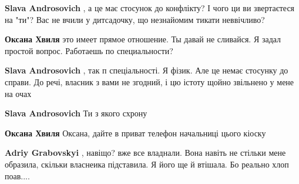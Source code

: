 \begin{itemize}
\begin{itemize}
 
\textbf{Slava Androsovich} , а це має стосунок до конфлікту? І чого ци ви звертаєтеся на "ти"? Вас не вчили у дитсадочку, що незнайомим тикати неввічливо?

 
\textbf{Оксана Хвиля} это имеет прямое отношение. Ты давай не сливайся. Я задал простой вопрос. Работаешь по специальности?

 
\textbf{Slava Androsovich} , так п спеціальності. Я фізик. Але це немає стосунку до справи. До речі, власник з вами не згодний, і цю істоту щойно звільнено у мене на очах

 
\textbf{Slava Androsovich} Ти з якого схрону

 
\textbf{Оксана Хвиля} Оксана, дайте в приват телефон начальниці цього кіоску

 
\textbf{Adriy Grabovskyi} , навіщо? вже все владнали. Вона навіть не стільки
мене образила, скільки власнеика підставила. Я його ще й втішала. Бо реально
хлоп поав....


\end{itemize}
\end{itemize}
